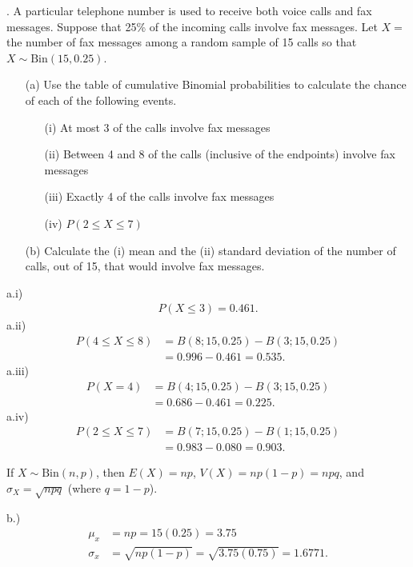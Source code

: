 \documentclass{report}
\begin{document}
 \pagebreak \bigbreak \noindent 
 \begin{mdframed}
     . A particular telephone number is used to receive both voice calls and fax messages. Suppose that 25\% of the incoming calls involve fax messages. Let \( X = \) the number of fax messages among a random sample of 15 calls so that \( X \sim \text{Bin}(15, 0.25) \).
     \begin{itemize}
         \item[(a)] Use the table of cumulative Binomial probabilities to calculate the chance of each of the following events.
             \begin{itemize}
                 \item[(i)] At most 3 of the calls involve fax messages
                 \item[(ii)] Between 4 and 8 of the calls (inclusive of the endpoints) involve fax messages
                 \item[(iii)] Exactly 4 of the calls involve fax messages
                 \item[(iv)] \( P(2 \leq X \leq 7) \)
             \end{itemize}
         \item[(b)] Calculate the (i) mean and the (ii) standard deviation of the number of calls, out of 15, that would involve fax messages.
     \end{itemize}
 \end{mdframed}
 \bigbreak \noindent 
 a.i) 
 \begin{align*}
     P(X \leq 3)  = 0.461
 .\end{align*}
 \bigbreak \noindent 
 a.ii) 
 \begin{align*}
     P( 4 \leq X \leq 8) &= B(8; 15, 0.25) - B(3; 15, 0.25) \\
     &=0.996 - 0.461 = 0.535
 .\end{align*}
 \bigbreak \noindent 
 a.iii) 
 \begin{align*}
     P(X=4) &= B(4;15,0.25) - B(3;15,0.25) \\
     &=0.686 - 0.461 = 0.225
 .\end{align*}
 \bigbreak \noindent 
 a.iv)
 \begin{align*}
     P(2 \leq X \leq 7) &= B(7;15,0.25) -B(1; 15,0.25) \\
   &=0.983 - 0.080 = 0.903
 .\end{align*}
 \bigbreak \noindent 
 \begin{remark}
     If \( X \sim \text{Bin}(n, p) \), then \( E(X) = np \), \( V(X) = np(1 - p) = npq \), and \( \sigma_X = \sqrt{npq} \) (where \( q = 1 - p \)).
 \end{remark}
 \bigbreak \noindent 
 b.)
 \begin{align*}
     \mu_{x} &= np = 15(0.25) = 3.75 \\
     \sigma_{x} &= \sqrt{np(1-p)} = \sqrt{3.75(0.75)} = 1.6771
 .\end{align*}
\end{document}
